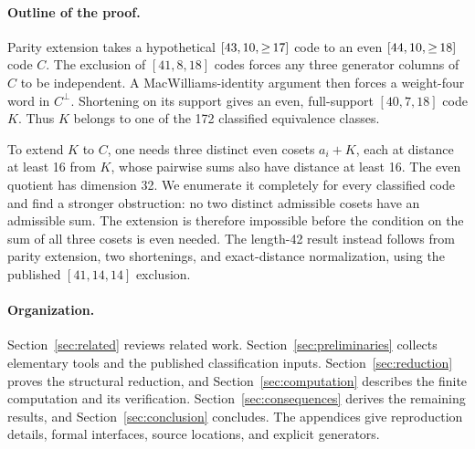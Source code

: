 \paragraph{Outline of the proof.}
Parity extension takes a hypothetical $\mbox{\ensuremath{[43,10,{\ge}\,17]}}$ code to an even $\mbox{\ensuremath{[44,10,{\ge}\,18]}}$ code $C$. The exclusion of $[41,8,18]$ codes \citep{bouyukliev2000} forces any three generator columns of $C$ to be independent. A MacWilliams-identity argument then forces a weight-four word in $C^\perp$. Shortening on its support gives an even, full-support $[40,7,18]$ code $K$. Thus $K$ belongs to one of the 172 classified equivalence classes.

To extend $K$ to $C$, one needs three distinct even cosets $a_i+K$, each at distance at least 16 from $K$, whose pairwise sums also have distance at least 16. The even quotient has dimension 32. We enumerate it completely for every classified code and find a stronger obstruction: no two distinct admissible cosets have an admissible sum. The extension is therefore impossible before the condition on the sum of all three cosets is even needed. The length-42 result instead follows from parity extension, two shortenings, and exact-distance normalization, using the published $[41,14,14]$ exclusion.

\paragraph{Organization.}
Section~\ref{sec:related} reviews related work. Section~\ref{sec:preliminaries} collects elementary tools and the published classification inputs. Section~\ref{sec:reduction} proves the structural reduction, and Section~\ref{sec:computation} describes the finite computation and its verification. Section~\ref{sec:consequences} derives the remaining results, and Section~\ref{sec:conclusion} concludes. The appendices give reproduction details, formal interfaces, source locations, and explicit generators.
